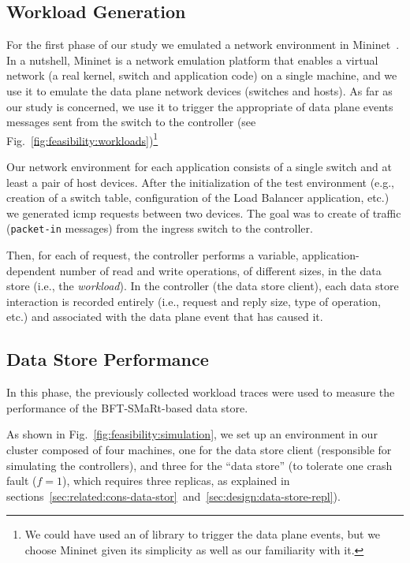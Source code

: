 \subsection{Workload Generation}
For the first phase of our study we emulated a network environment in Mininet~\cite{Handigol:2012tg}. 
In a nutshell, Mininet is a network emulation platform that enables a virtual network (a real kernel, switch and application code) on a single machine, and we use it to emulate the data plane network devices (switches and hosts). 
As far as our study is concerned, we use it to trigger the appropriate \gls{of} data plane events messages sent from the switch to the controller (see Fig.~\ref{fig:feasibility:workloads})\footnote{We could have used an \gls{of} library to trigger the data plane events, but we choose Mininet given its simplicity as well as our familiarity with it.} 

Our network environment for each application consists  of a single switch and at least a pair of host devices.
After the initialization of the test environment (e.g., creation of a switch table, configuration of the Load Balancer application, etc.) we  generated \gls{icmp} requests between two devices. 
The goal was to create \gls{of}  traffic (\texttt{packet-in} messages) from the ingress switch to the controller. 

Then, for each \gls{of} request, the controller performs a variable, application-dependent number of read and write operations, of different sizes, in the data store (i.e., the \textit{workload}). 
In the controller (the data store client),  each data store interaction is recorded entirely (i.e., request and reply size, type of operation, etc.) and associated with the data plane event that has caused it. 

\subsection{ Data Store Performance}
In this phase, the previously collected workload traces were used to measure the performance of the BFT-SMaRt-based data store. 

As shown in Fig.~\ref{fig:feasibility:simulation}, we set up an environment in our cluster composed of four machines, one for the data store client (responsible for simulating the controllers), and three for the ``data store'' (to tolerate one crash fault ($f=1$), which requires three replicas, as explained in sections~\ref{sec:related:cons-data-stor}~and~\ref{sec:design:data-store-repl}). 

